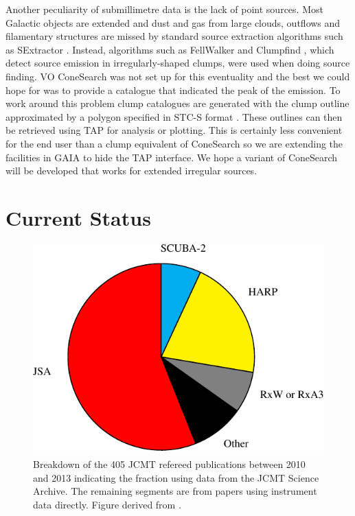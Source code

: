 \documentclass[final,authoryear,5p,times,twocolumn]{elsarticle}
\begin{document}
Another peculiarity of submillimetre data is the lack of point
sources. Most Galactic objects are extended and dust and gas from
large clouds, outflows and filamentary structures are missed by
standard source extraction algorithms such as SExtractor
\citep[][]{1996A&AS..117..393B}. Instead, algorithms
such as FellWalker \citep[][]{2015FW,2007ASPC..376..425B} and
Clumpfind \citep[][]{1994ApJ...428..693W}, which detect
source emission in irregularly-shaped clumps, were used when
doing source finding. VO ConeSearch was not
set up for this eventuality and the best we could hope for was to
provide a catalogue that indicated the peak of the emission. To work
around this problem clump catalogues are generated with the clump
outline approximated by a polygon specified in STC-S format
\citep{2010ASPC..434..213B}. These outlines can then be retrieved
using TAP for analysis or plotting. This is certainly less convenient
for the end user than a clump equivalent of ConeSearch so we are
extending the facilities in GAIA
\citep[][]{2009ASPC..411..575D} to hide the TAP
interface. We hope a variant of ConeSearch will be developed that
works for extended irregular sources.

\section{Current Status}

\begin{figure}[t]
\includegraphics[width=\columnwidth]{jcmt-pubs-crop}
\caption{Breakdown of the 405 JCMT refereed publications between 2010 and
    2013 indicating the fraction using data from the JCMT Science
    Archive. The remaining segments are from papers using instrument
    data directly. Figure derived from \citet{2014SPIE9152-93}.}
\label{fig:jsapubs}
\end{figure}
\end{document}
